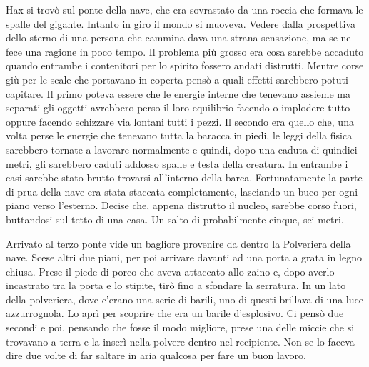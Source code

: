     Hax si trovò sul ponte della nave, che era sovrastato da una roccia che
    formava le spalle del gigante. Intanto in giro il mondo si muoveva.
    Vedere dalla prospettiva dello sterno di una persona che cammina dava
    una strana sensazione, ma se ne fece una ragione in poco tempo. Il
    problema più grosso era cosa sarebbe accaduto quando entrambe i
    contenitori per lo spirito fossero andati distrutti. Mentre corse giù
    per le scale che portavano in coperta pensò a quali effetti sarebbero
    potuti capitare. Il primo poteva essere che le energie interne che
    tenevano assieme ma separati gli oggetti avrebbero perso il loro
    equilibrio facendo o implodere tutto oppure facendo schizzare via
    lontani tutti i pezzi. Il secondo era quello che, una volta perse le
    energie che tenevano tutta la baracca in piedi, le leggi della fisica
    sarebbero tornate a lavorare normalmente e quindi, dopo una caduta di
    quindici metri, gli sarebbero caduti addosso spalle e testa della
    creatura. In entrambe i casi sarebbe stato brutto trovarsi all'interno
    della barca. Fortunatamente la parte di prua della nave era stata
    staccata completamente, lasciando un buco per ogni piano verso
    l'esterno. Decise che, appena distrutto il nucleo, sarebbe corso fuori,
    buttandosi sul tetto di una casa. Un salto di probabilmente cinque, sei
    metri.

    Arrivato al terzo ponte vide un bagliore provenire da dentro la
    Polveriera della nave. Scese altri due piani, per poi arrivare davanti
    ad una porta a grata in legno chiusa. Prese il piede di porco che aveva
    attaccato allo zaino e, dopo averlo incastrato tra la porta e lo
    stipite, tirò fino a sfondare la serratura. In un lato della
    polveriera, dove c'erano una serie di barili, uno di questi brillava di
    una luce azzurrognola. Lo aprì per scoprire che era un barile
    d'esplosivo. Ci pensò due secondi e poi, pensando che fosse il modo
    migliore, prese una delle miccie che si trovavano a terra e la inserì
    nella polvere dentro nel recipiente. Non se lo faceva dire due volte di
    far saltare in aria qualcosa per fare un buon lavoro.

